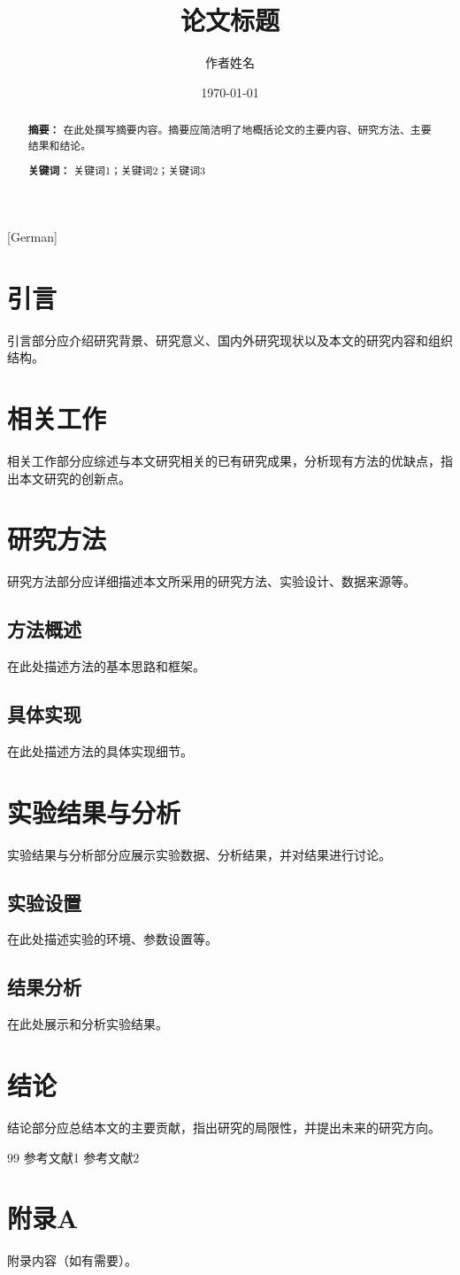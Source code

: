[German] \documentclass[12pt,a4paper]{article}
\title{论文标题}
\author{作者姓名}
\date{\today}
\begin{document}
\maketitle

\begin{abstract}
\textbf{摘要：} 在此处撰写摘要内容。摘要应简洁明了地概括论文的主要内容、研究方法、主要结果和结论。

\textbf{关键词：} 关键词1；关键词2；关键词3
\end{abstract}

\tableofcontents
\newpage

\section{引言}
引言部分应介绍研究背景、研究意义、国内外研究现状以及本文的研究内容和组织结构。

\section{相关工作}
相关工作部分应综述与本文研究相关的已有研究成果，分析现有方法的优缺点，指出本文研究的创新点。

\section{研究方法}
研究方法部分应详细描述本文所采用的研究方法、实验设计、数据来源等。

\subsection{方法概述}
在此处描述方法的基本思路和框架。

\subsection{具体实现}
在此处描述方法的具体实现细节。

\section{实验结果与分析}
实验结果与分析部分应展示实验数据、分析结果，并对结果进行讨论。

\subsection{实验设置}
在此处描述实验的环境、参数设置等。

\subsection{结果分析}
在此处展示和分析实验结果。

\section{结论}
结论部分应总结本文的主要贡献，指出研究的局限性，并提出未来的研究方向。

\begin{thebibliography}{99}
 参考文献1
 参考文献2
\end{thebibliography}

\appendix
\section{附录A}
附录内容（如有需要）。
\end{document}
